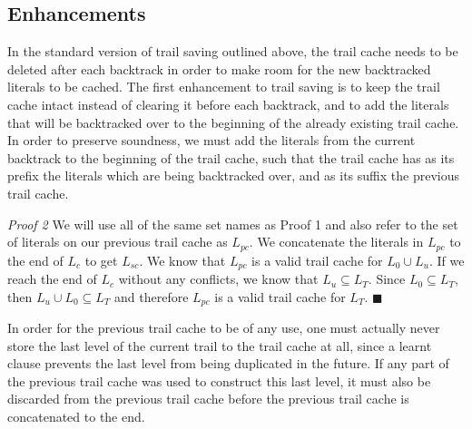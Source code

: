 \documentclass[runningheads]{llncs}
\begin{document}

\subsection{Enhancements}

In the standard version of trail saving outlined above, the trail
cache needs to be deleted after each backtrack in order to make room
for the new backtracked literals to be cached. The first enhancement
to trail saving is to keep the trail cache intact instead of clearing
it before each backtrack, and to add the literals that will be
backtracked over to the beginning of the already existing trail
cache. In order to preserve soundness, we must add the literals from
the current backtrack to the beginning of the trail cache, such that
the trail cache has as its prefix the literals which are being
backtracked over, and as its suffix the previous trail cache. \newline

\textit{Proof 2} We will use all of the same set names as Proof 1 and
also refer to the set of literals on our previous trail cache as
$L_{pc}$. We concatenate the literals in $L_{pc}$ to the end of $L_c$
to get $L_{sc}$. We know that $L_{pc}$ is a valid trail cache for
$L_0 \cup L_u$. If we reach the end of $L_c$ without any conflicts, we
know that $L_u \subseteq L_T$. Since $L_0 \subseteq L_T$, then
$L_u \cup L_0 \subseteq L_T$ and therefore $L_{pc}$ is a valid trail
cache for $L_T$. $\blacksquare$\newline

In order for the previous trail cache to be of any use, one must
actually never store the last level of the current trail to the trail
cache at all, since a learnt clause prevents the last level from being
duplicated in the future. If any part of the previous trail cache was
used to construct this last level, it must also be discarded from the
previous trail cache before the previous trail cache is concatenated
to the end.
\end{document}
